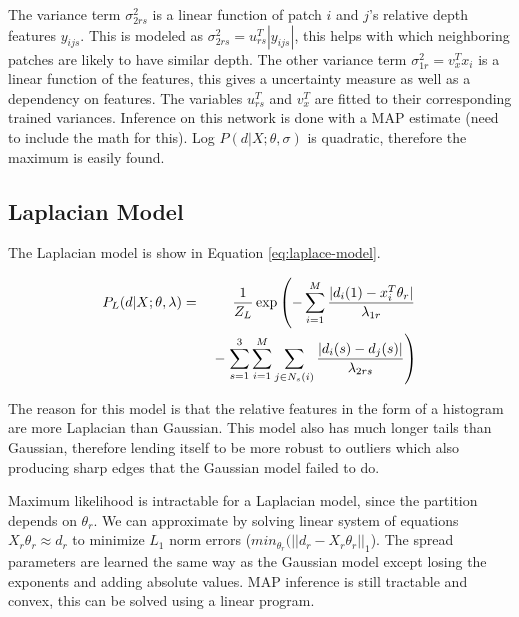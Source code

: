 \documentclass[journal]{IEEEtran}
\begin{document}
The variance term $\sigma_{2rs}^2$ is a linear function of patch $i$ and $j$'s relative depth features $y_{ijs}$. This is modeled as $\sigma_{2rs}^2 = u^T_{rs}|y_{ijs}|$, this helps with which neighboring patches are likely to have similar depth. The other variance term $\sigma^2_{1r} = v_x^T x_i$ is a linear function of the features, this gives a uncertainty measure as well as a dependency on features. The variables $u^T_{rs}$ and $v_x^T$ are fitted to their corresponding trained variances. Inference on this network is done with a MAP estimate (need to include the math for this). Log $P(d|X; \theta, \sigma)$ is quadratic, therefore the maximum is easily found.

\subsection{Laplacian Model}
The Laplacian model is show in Equation \ref{eq:laplace-model}.

\setlength{\arraycolsep}{0.0em}
\begin{eqnarray}
\label{eq:laplace-model}
P_L(d|X; \theta, \lambda) &{}={}& \frac{1}{Z_L}\exp\left(-\sum_{i=1}^{M}\frac{|d_i(1)-x_i^T\theta_r|}{\lambda_{1r}} \vphantom{\sum_{j \in N_s(i)}}\right.\nonumber\\
&&- \left.\sum_{s=1}^3\sum_{i=1}^M\sum_{j \in N_s(i)} \frac{|d_i(s)-d_j(s)|}{\lambda_{2rs}}\right)
\end{eqnarray}
\setlength{\arraycolsep}{0.0em}

The reason for this model is that the relative features in the form of a histogram are more Laplacian than Gaussian. This model also has much longer tails than Gaussian, therefore lending itself to be more robust to outliers which also producing sharp edges that the Gaussian model failed to do.

Maximum likelihood is intractable for a Laplacian model, since the partition depends on $\theta_r$. We can approximate by solving linear system of equations $X_r\theta_r \approx d_r$ to minimize $L_1$ norm errors ($min_{\theta_r}(||d_r-X_r\theta_r||_1$). The spread parameters are learned the same way as the Gaussian model except losing the exponents and adding absolute values. MAP inference is still tractable and convex, this can be solved using a linear program.
\end{document}
